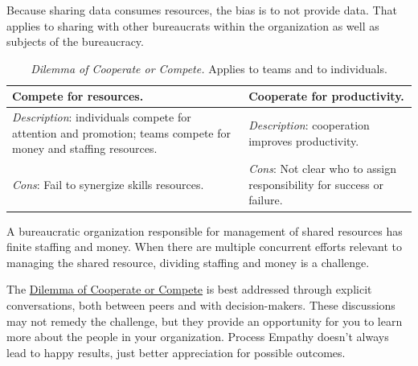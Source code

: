 Because sharing data consumes resources, the bias is to not provide data. That applies to sharing with other bureaucrats within the organization as well as subjects of the bureaucracy. 


\begin{center}
\begin{table}[H] %
\begin{tabular}{ | m{\dilemmatablewidth}| m{\dilemmatablewidth} | } 
  \hline
  \textbf{Compete for resources.} &
  \textbf{Cooperate for productivity.} \\
  \hline
  \textit{Description}: individuals compete for attention and promotion; teams compete for money and staffing resources. &
  \textit{Description}: cooperation improves productivity. \\  
  \hline
  \textit{Cons}: Fail to synergize skills resources. & 
  \textit{Cons}: Not clear who to assign responsibility for success or failure. \\
  \hline
\end{tabular}
\caption{
\textit{Dilemma of Cooperate or Compete.} 
Applies to teams and to individuals. 
}
\label{table:dilemma-personal-cooperate-vs-compete}
\end{table}
\end{center}


A bureaucratic organization responsible for management of shared resources has finite staffing and money. When there are multiple concurrent efforts relevant to managing the shared resource,  dividing staffing and money is a challenge. 

The \hyperref[table:dilemma-personal-cooperate-vs-compete]{Dilemma of Cooperate or Compete} 
\iftoggle{printedonpaper}{ (\ref{table:dilemma-personal-cooperate-vs-compete}) }{}%
is best addressed through explicit conversations,
both between peers and with decision-makers. These discussions may not remedy the challenge, but they provide an opportunity for you to learn more about the people in your organization. Process Empathy doesn't always lead to happy results, just better appreciation for possible outcomes.

